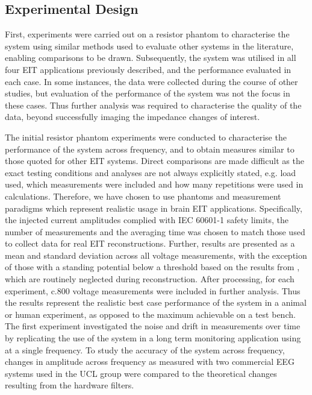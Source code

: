 \subsection{Experimental Design}

First, experiments were carried out on a resistor phantom to characterise the system using similar methods  used to evaluate other systems in the literature, enabling comparisons to be drawn. Subsequently, the system was utilised in all four EIT applications previously described, and the performance evaluated in each case. In some instances, the data were collected during the course of other studies, but evaluation of the performance of the system was not the focus in these cases. Thus further analysis was required to characterise the quality of the data, beyond successfully imaging the impedance changes of interest. 

The initial resistor phantom experiments were conducted to characterise the performance of the system across frequency, and to obtain measures similar to those quoted for other EIT systems. Direct comparisons are made difficult as the exact testing conditions and analyses are not always explicitly stated, e.g. load used, which measurements were included and how many repetitions were used in calculations. Therefore, we have chosen to use phantoms and measurement paradigms which represent realistic usage in brain EIT applications. Specifically, the injected current amplitudes complied with IEC 60601-1 \cite{IEC} safety limits, the number of measurements and the averaging time was chosen to match those used to collect data for real EIT reconstructions. Further, results are presented as a mean and standard deviation across all voltage measurements, with the exception of those with a standing potential below a threshold based on the results from \citet{packham2012comparison}, which are routinely neglected during reconstruction. After processing, for each experiment, c.800 voltage measurements were included in further analysis. Thus the results represent the realistic best case performance of the system in a animal or human experiment, as opposed to the maximum achievable on a test bench. The first experiment investigated the noise and drift in measurements over time by replicating the use of the system in a long term monitoring application using at a single frequency. To study the accuracy of the system across frequency, changes in amplitude across frequency as measured with two commercial EEG systems used in the UCL group were compared to the theoretical changes resulting from the hardware filters. 

